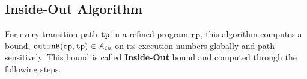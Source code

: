 \subsection{Inside-Out Algorithm}
\label{sec:inoutalg}
For every transition path $\mathtt{tp}$ in a refined program $\mathtt{rp}$, 
this algorithm
computes a bound, $\mathtt{outinB}(\mathtt{rp}, \mathtt{tp}) \in \mathcal{A}_{in}$
on its execution numbers globally and path-sensitively.
This bound is called \textbf{Inside-Out} bound and computed
through the following steps.
%
